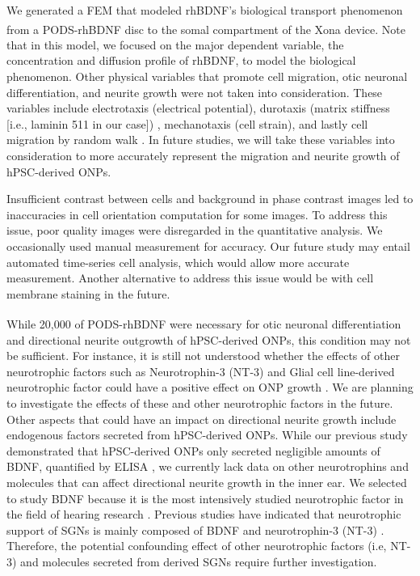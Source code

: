\documentclass[review]{elsarticle}
\begin{document}
\indent We generated a FEM that modeled rhBDNF's biological transport phenomenon from a PODS\textsuperscript{\textregistered}-rhBDNF disc to the somal compartment of the Xona\textsuperscript{\texttrademark} device. Note that in this model, we focused on the major dependent variable, the concentration and diffusion profile of rhBDNF, to model the biological phenomenon. Other physical variables that promote cell migration, otic neuronal differentiation, and neurite growth were not taken into consideration. These variables include electrotaxis (electrical potential), durotaxis (matrix stiffness [i.e., laminin 511 in our case]) \cite{Gentile2016}, mechanotaxis (cell strain), and lastly cell migration by random walk \cite{berg1983}. In future studies, we will take these variables into consideration to more accurately represent the migration and neurite growth of hPSC-derived ONPs. 

\indent Insufficient contrast between cells and background in phase contrast images led to inaccuracies in cell orientation computation for some images. To address this issue, poor quality images were disregarded in the quantitative analysis. We occasionally used manual measurement for accuracy. Our future study may entail automated time-series cell analysis, which would allow more accurate measurement. Another alternative to address this issue would be with cell membrane staining in the future. 

\indent While 20,000 of PODS\textsuperscript{\textregistered}-rhBDNF were necessary for otic neuronal differentiation and directional neurite outgrowth of hPSC-derived ONPs, this condition may not be sufficient. For instance, it is still not understood whether the effects of other neurotrophic factors such as Neurotrophin-3 (NT-3) and Glial cell line-derived neurotrophic factor could have a positive effect on ONP growth \cite{green2012, li2017, Schulze2020}. We are planning to investigate the effects of these and other neurotrophic factors in the future. Other aspects that could have an impact on directional neurite growth include endogenous factors secreted from hPSC-derived ONPs. While our previous study demonstrated that hPSC-derived ONPs only secreted negligible amounts of BDNF, quantified by ELISA \cite{Chang2020}, we currently lack data on other neurotrophins and molecules that can affect directional neurite growth in the inner ear. We selected to study BDNF because it is the most intensively studied neurotrophic factor in the field of hearing research \cite{green2012}. Previous studies have indicated that neurotrophic support of SGNs is mainly composed of BDNF and neurotrophin-3 (NT-3) \cite{green2012,Sasi2017}. Therefore, the potential confounding effect of other neurotrophic factors (i.e, NT-3) and molecules secreted from derived SGNs require further investigation.  
\end{document}
